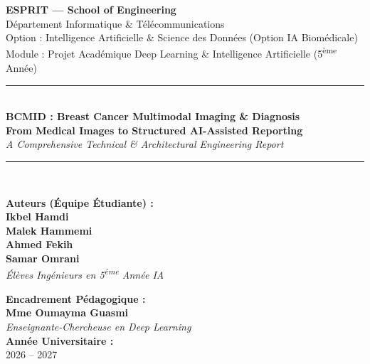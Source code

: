\documentclass[11pt,a4paper]{article}
\begin{document}
\begin{titlepage}
\begin{center}

{\LARGE \textbf{ESPRIT --- School of Engineering}}\\[0.2cm]
{\large Département Informatique \& Télécommunications}\\[0.1cm]
{\normalsize Option : Intelligence Artificielle \& Science des Données (Option IA Biomédicale)}\\[0.3cm]
{\small Module : Projet Académique Deep Learning \& Intelligence Artificielle (5\textsuperscript{ème} Année)}\\[0.6cm]

\rule{\linewidth}{1.5pt}\\[0.4cm]
{\huge \bfseries \textcolor{NavyBlue}{BCMID : Breast Cancer Multimodal Imaging \& Diagnosis}}\\[0.25cm]
{\Large \bfseries \textcolor{DeepCyan}{From Medical Images to Structured AI-Assisted Reporting}}\\[0.2cm]
{\large \textit{A Comprehensive Technical \& Architectural Engineering Report}}\\[0.2cm]
\rule{\linewidth}{1.5pt}\\[0.8cm]

\begin{minipage}[t]{0.48\textwidth}
\textbf{\large Auteurs (Équipe Étudiante) :}\\[0.2cm]
\textbf{Ikbel Hamdi}\\
\textbf{Malek Hammemi}\\
\textbf{Ahmed Fekih}\\
\textbf{Samar Omrani}\\[0.4cm]
\textit{Élèves Ingénieurs en 5\textsuperscript{ème} Année IA}
\end{minipage}
\hfill
\begin{minipage}[t]{0.48\textwidth}
\begin{flushright}
\textbf{\large Encadrement Pédagogique :}\\[0.2cm]
\textbf{Mme Oumayma Guasmi}\\[0.4cm]
\textit{Enseignante-Chercheuse en Deep Learning}\\[0.6cm]
\textbf{Année Universitaire :}\\[0.1cm]
2026 -- 2027
\end{flushright}
\end{minipage}


\end{center}
\end{titlepage}
\end{document}
